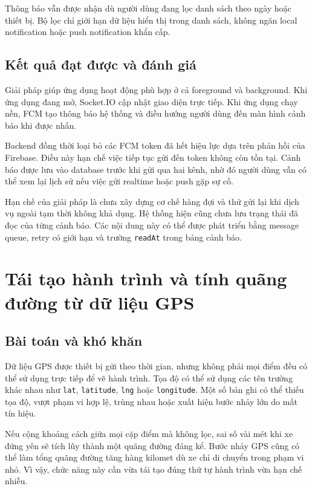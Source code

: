 \documentclass[../DoAn.tex]{subfiles}
\begin{document}
Thông báo vẫn được nhận dù người dùng đang lọc danh sách theo ngày hoặc thiết
bị. Bộ lọc chỉ giới hạn dữ liệu hiển thị trong danh sách, không ngăn local
notification hoặc push notification khẩn cấp.

\subsection{Kết quả đạt được và đánh giá}

Giải pháp giúp ứng dụng hoạt động phù hợp ở cả foreground và background. Khi
ứng dụng đang mở, Socket.IO cập nhật giao diện trực tiếp. Khi ứng dụng chạy nền,
FCM tạo thông báo hệ thống và điều hướng người dùng đến màn hình cảnh báo khi
được nhấn.

Backend đồng thời loại bỏ các FCM token đã hết hiệu lực dựa trên phản hồi của
Firebase. Điều này hạn chế việc tiếp tục gửi đến token không còn tồn tại. Cảnh
báo được lưu vào database trước khi gửi qua hai kênh, nhờ đó người dùng vẫn có
thể xem lại lịch sử nếu việc gửi realtime hoặc push gặp sự cố.

Hạn chế của giải pháp là chưa xây dựng cơ chế hàng đợi và thử gửi lại khi dịch
vụ ngoài tạm thời không khả dụng. Hệ thống hiện cũng chưa lưu trạng thái đã đọc
của từng cảnh báo. Các nội dung này có thể được phát triển bằng message queue,
retry có giới hạn và trường \texttt{readAt} trong bảng cảnh báo.

\section{Tái tạo hành trình và tính quãng đường từ dữ liệu GPS}
\label{sec:tai-tao-hanh-trinh}

\subsection{Bài toán và khó khăn}

Dữ liệu GPS được thiết bị gửi theo thời gian, nhưng không phải mọi điểm đều có
thể sử dụng trực tiếp để vẽ hành trình. Tọa độ có thể sử dụng các tên trường
khác nhau như \texttt{lat}, \texttt{latitude}, \texttt{lng} hoặc
\texttt{longitude}. Một số bản ghi có thể thiếu tọa độ, vượt phạm vi hợp lệ,
trùng nhau hoặc xuất hiện bước nhảy lớn do mất tín hiệu.

Nếu cộng khoảng cách giữa mọi cặp điểm mà không lọc, sai số vài mét khi xe đứng
yên sẽ tích lũy thành một quãng đường đáng kể. Bước nhảy GPS cũng có thể làm
tổng quãng đường tăng hàng kilomet dù xe chỉ di chuyển trong phạm vi nhỏ. Vì
vậy, chức năng này cần vừa tái tạo đúng thứ tự hành trình vừa hạn chế nhiễu.
\end{document}
